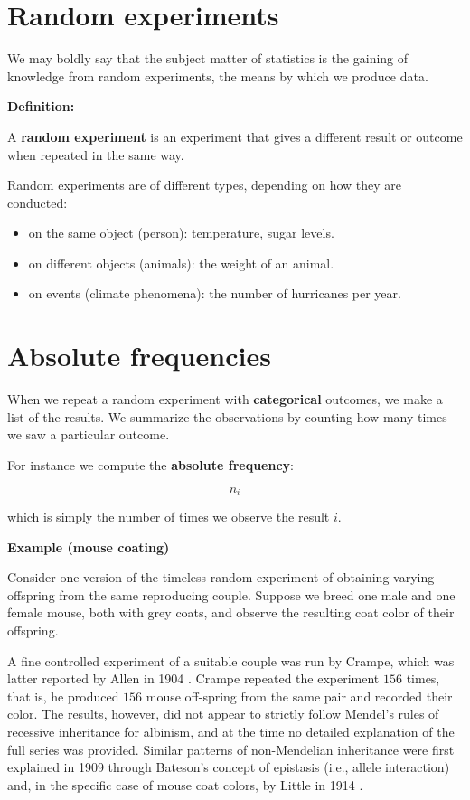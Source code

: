 \documentclass[
]{book}
\providecommand{\tightlist}{%
  \setlength{\itemsep}{0pt}\setlength{\parskip}{0pt}}
\begin{document}
\hypertarget{random-experiments}{%
\section{Random experiments}\label{random-experiments}}

We may boldly say that the subject matter of statistics is the gaining of knowledge from random experiments, the means by which we produce data.

\textbf{Definition:}

A \textbf{random experiment} is an experiment that gives a different result or outcome when repeated in the same way.

Random experiments are of different types, depending on how they are conducted:

\begin{itemize}
\tightlist
\item
  on the same object (person): temperature, sugar levels.
\item
  on different objects (animals): the weight of an animal.
\item
  on events (climate phenomena): the number of hurricanes per year.
\end{itemize}

\hypertarget{absolute-frequencies}{%
\section{Absolute frequencies}\label{absolute-frequencies}}

When we repeat a random experiment with \textbf{categorical} outcomes, we make a list of the results. We summarize the observations by counting how many times we saw a particular outcome.

For instance we compute the \textbf{absolute frequency}:

\[n_i\]

which is simply the number of times we observe the result \(i\).

\textbf{Example (mouse coating)}

Consider one version of the timeless random experiment of obtaining varying offspring from the same reproducing couple. Suppose we breed one male and one female mouse, both with grey coats, and observe the resulting coat color of their offspring.

A fine controlled experiment of a suitable couple was run by Crampe, which was latter reported by Allen in 1904 \citep{allen1904heredity}. Crampe repeated the experiment \(156\) times, that is, he produced \(156\) mouse off-spring from the same pair and recorded their color. The results, however, did not appear to strictly follow Mendel's rules of recessive inheritance for albinism, and at the time no detailed explanation of the full series was provided. Similar patterns of non-Mendelian inheritance were first explained in 1909 through Bateson's concept of epistasis (i.e., allele interaction) and, in the specific case of mouse coat colors, by Little in 1914 \citep{little1914possible}.
\end{document}
